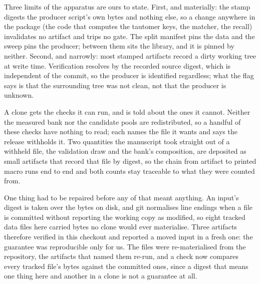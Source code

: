\documentclass[journal=jcisd8,manuscript=suppinfo,layout=onecolumn]{achemso}
\begin{document}
Three limits of the apparatus are ours to state. First, and materially: the stamp digests the
producer script's own bytes and nothing else, so a change anywhere in the package (the code
that computes the tautomer keys, the matcher, the recall) invalidates no artifact and trips no
gate. The split manifest pins the data and the sweep pins the producer; between them sits the
library, and it is pinned by neither. Second, and narrowly: most stamped artifacts record a dirty
working tree at write time. Verification resolves by the recorded source digest, which is
independent of the commit, so the producer is identified regardless; what the flag says is that
the surrounding tree was not clean, not that the producer is unknown.

A clone gets the checks it can run, and is told about the ones it cannot. Neither the
measured bank nor the candidate pools are redistributed, so a handful of these checks have nothing
to read; each names the file it wants and says the release withholds it. Two
quantities the manuscript took straight out of a withheld file, the validation draw and the
bank's composition, are deposited as small artifacts
that record that file by digest, so the chain from artifact to printed macro runs end to end and
both counts stay traceable to
what they were counted from.

One thing had to be repaired before any of that meant anything. An input's digest is taken over the
bytes on disk, and git normalises line endings when a file is committed without reporting the
working copy as modified, so eight tracked data files here carried bytes no clone would ever
materialise. Three artifacts therefore verified in this checkout and reported a moved input in a
fresh one: the guarantee was reproducible only for us. The files were re-materialised from the
repository, the artifacts that named them re-run, and a check now compares every tracked file's
bytes against the committed ones, since a digest that means one thing here and another in a clone is
not a guarantee at all.
\end{document}

